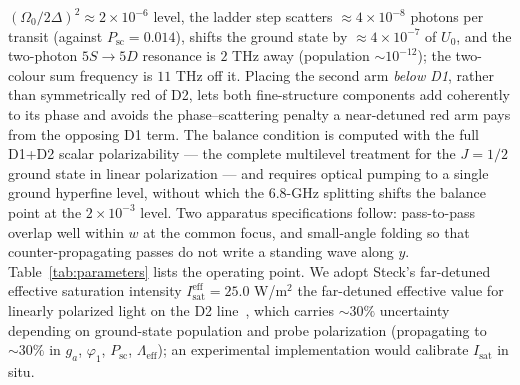 \documentclass[11pt,a4paper]{article}
\begin{document}
$(\Omega_0/2\Delta)^2 \approx 2\times 10^{-6}$ level, the ladder step scatters $\approx 4\times 10^{-8}$ photons per transit (against $P_\text{sc} = 0.014$), shifts the ground state by $\approx 4\times 10^{-7}$ of $U_0$, and the two-photon $5S \to 5D$ resonance is $2$ THz away (population $\sim 10^{-12}$); the two-colour sum frequency is $11$ THz off it. Placing the second arm \emph{below D1}, rather than symmetrically red of D2, lets both fine-structure components add coherently to its phase and avoids the phase--scattering penalty a near-detuned red arm pays from the opposing D1 term. The balance condition is computed with the full D1+D2 scalar polarizability --- the complete multilevel treatment for the $J = 1/2$ ground state in linear polarization --- and requires optical pumping to a single ground hyperfine level, without which the 6.8-GHz splitting shifts the balance point at the $2\times 10^{-3}$ level. Two apparatus specifications follow: pass-to-pass overlap well within $w$ at the common focus, and small-angle folding so that counter-propagating passes do not write a standing wave along $y$. Table~\ref{tab:parameters} lists the operating point. We adopt Steck's far-detuned effective saturation intensity $I_\text{sat}^\text{eff} = 25.0$ W/m$^2$ the far-detuned effective value for linearly polarized light on the D2 line~\cite{Steck}, which carries $\sim 30\%$ uncertainty depending on ground-state population and probe polarization (propagating to $\sim 30\%$ in $g_a$, $\varphi_1$, $P_\text{sc}$, $\Lambda_\text{eff}$); an experimental implementation would calibrate $I_\text{sat}$ in situ.
\end{document}
